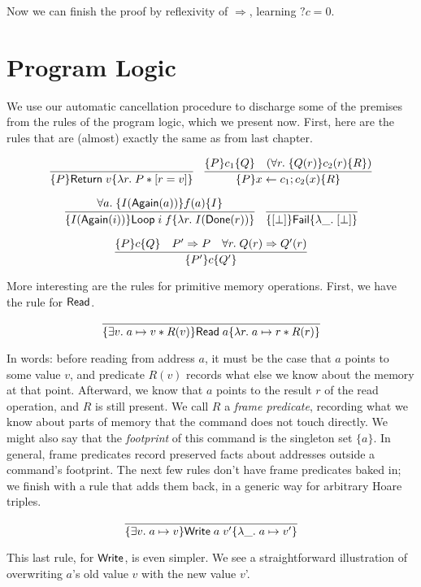 \documentclass{amsbook}
\theoremstyle{definition}
\theoremstyle{remark}
\numberwithin{section}{chapter}
\numberwithin{equation}{chapter}
\begin{document}
Now we can finish the proof by reflexivity of $\Rightarrow$, learning $?c = 0$.

\section{Program Logic}

We use our automatic cancellation procedure to discharge some of the premises from the rules of the program logic, which we present now.
First, here are the rules that are (almost) exactly the same as from last chapter.

$$\infer{\hoare{P}{\mt{Return} \; v}{\lambda r. \; P * \lift{r = v}}}{}
\quad \infer{\hoare{P}{x \leftarrow c_1; c_2(x)}{R}}{
  \hoare{P}{c_1}{Q}
  & (\forall r. \; \hoare{Q(r)}{c_2(r)}{R})
}$$

$$\infer{\hoare{I(\mt{Again}(i))}{\mt{Loop} \; i \; f}{\lambda r. \; I(\mt{Done}(r))}}{
  \forall a. \; \hoare{I(\mt{Again}(a))}{f(a)}{I}
}
\quad \infer{\hoare{\lift{\bot}}{\mt{Fail}}{\lambda \_. \; \lift{\bot}}}{}$$

$$\infer{\hoare{P'}{c}{Q'}}{
  \hoare{P}{c}{Q}
  & P' \Rightarrow P
  & \forall r. \; Q(r) \Rightarrow Q'(r)
}$$

More interesting are the rules for primitive memory operations.
First, we have the rule for $\mathsf{Read}$.

$$\infer{\hoare{\exists v. \; \ptsto{a}{v} * R(v)}{\mt{Read} \; a}{\lambda r. \; \ptsto{a}{r} * R(r)}}{}$$

In words: before reading from address $a$, it must be the case that $a$ points to some value $v$, and predicate $R(v)$ records what else we know about the memory at that point.
Afterward, we know that $a$ points to the result $r$ of the read operation, and $R$ is still present.
We call $R$ a \emph{frame predicate}, recording what we know about parts of memory that the command does not touch directly.
We might also say that the \emph{footprint} of this command is the singleton set $\{a\}$.
In general, frame predicates record preserved facts about addresses outside a command's footprint.
The next few rules don't have frame predicates baked in; we finish with a rule that adds them back, in a generic way for arbitrary Hoare triples.

$$\infer{\hoare{\exists v. \; \ptsto{a}{v}}{\mt{Write} \; a \; v'}{\lambda \_. \; \ptsto{a}{v'}}}{}$$

This last rule, for $\mathsf{Write}$, is even simpler.
We see a straightforward illustration of overwriting $a$'s old value $v$ with the new value $v$'.
\end{document}
